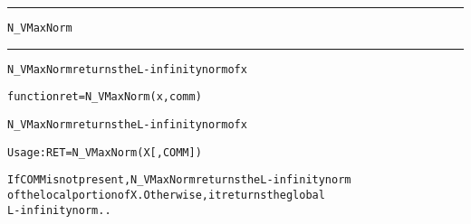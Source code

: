 \begin{samepage}
\hrule
\begin{center}
{\large \verb!N_VMaxNorm!}
\label{p:N_VMaxNorm}
\end{center}
\hrule\vspace{0.1in}



\begin{alltt}
N_VMaxNorm returns the L-infinity norm of x
\end{alltt}

\end{samepage}



\begin{samepage}


\begin{alltt}
function ret = N_VMaxNorm(x, comm) 
\end{alltt}

\end{samepage}



\begin{alltt}
N_VMaxNorm returns the L-infinity norm of x

   Usage:  RET = N_VMaxNorm ( X [, COMM] )

If COMM is not present, N_VMaxNorm returns the L-infinity norm 
of the local portion of X. Otherwise, it returns the global
L-infinity norm..
\end{alltt}





 



\vspace{0.1in}